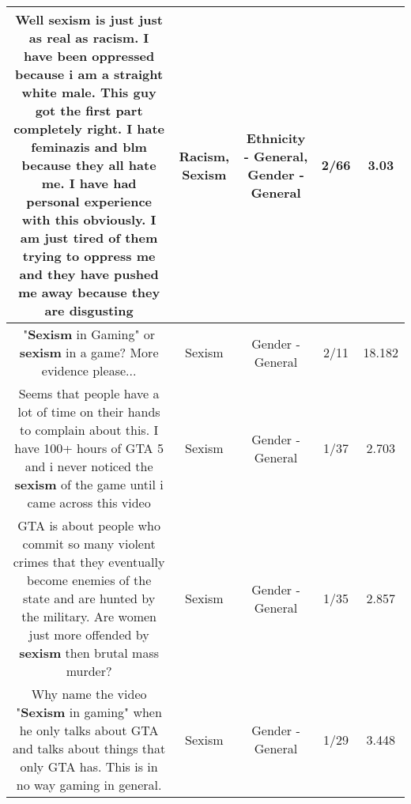 \documentclass[11pt]{article}
\newlength\mylength
\begin{document}
\begin{center}
\begin{longtable}{|C{.65\mylength}|C{.30\mylength}|C{.12\mylength}|C{.12\mylength}|C{.12\mylength}|}
  \small Well \textbf{sexism} is just just as real as \textbf{racism}.  I have been oppressed because i am a straight white male.  This guy got the first part completely right.  I hate feminazis and blm because they all hate me.  I have had personal experience with this obviously. I am just tired of them trying to oppress me and they have pushed me away because they are disgusting\normalsize   & Racism, Sexism & Ethnicity - General, Gender - General & 2/66 & 3.03 \\  \hline
  \small "\textbf{Sexism} in Gaming" or \textbf{sexism} in a game? More evidence please...\normalsize   & Sexism & Gender - General & 2/11 & 18.182 \\  \hline
  \small Seems that people have a lot of time on their hands to complain about this. I have 100+ hours of GTA 5 and i never noticed the \textbf{sexism} of the game until i came across this video\normalsize   & Sexism & Gender - General & 1/37 & 2.703 \\  \hline
  \small GTA is about people who commit so many violent crimes that they eventually become enemies of the state and are hunted by the military. Are women just more offended by \textbf{sexism} then brutal mass murder?\normalsize   & Sexism & Gender - General & 1/35 & 2.857 \\  \hline
  \small Why name the video "\textbf{Sexism} in gaming" when he only talks about GTA and talks about things that only GTA has. This is in no way gaming in general.\normalsize   & Sexism & Gender - General & 1/29 & 3.448 \\  \hline

\end{longtable}
\end{center}
\end{document}
